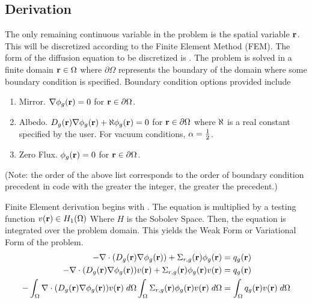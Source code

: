   \subsection{Derivation}
    \label{sec:formulation:derivation}
    The only remaining continuous variable in the problem is the spatial 
    variable $\mathbf{r}$. This will be discretized according to the Finite Element 
    Method (FEM). The form of the diffusion equation to be discretized is 
    . The problem is solved in a finite domain 
    $\mathbf{r} \in \Omega$ where $\partial \Omega$ represents the boundary of the 
    domain where some boundary condition is specified. Boundary condition 
    options provided include
    \begin{enumerate}
      \item Mirror. $\mathbf{\nabla} \phi_g(\mathbf{r}) = 0$ for $\mathbf{r} \in \partial \Omega$.
      \item Albedo. $D_g(\mathbf{r}) \mathbf{\nabla} \phi_g(\mathbf{r}) + \aleph \phi_g(\mathbf{r})=0$ for 
        $\mathbf{r} \in \partial \Omega$ where $\aleph$ is a real constant specified
        by the user. For vacuum conditions, $\alpha = \frac{1}{2}$.
      \item Zero Flux. $\phi_g(\mathbf{r}) = 0$ for $\mathbf{r} \in \partial \Omega$.
    \end{enumerate}
    (Note: the order of the above list corresponds to the order of boundary 
    condition precedent in code with the greater the integer, the greater the 
    precedent.)
    
    Finite Element derivation begins with .
    The equation is multiplied by a testing function $v(\mathbf{r}) \in H_1(\Omega)$ 
    Where $H$ is the Sobolev Space. Then, the equation is integrated over the 
    problem domain. This yields the Weak Form or Variational Form of the 
    problem.
    \begin{align}
      -\mathbf{\nabla} \cdot (D_g(\mathbf{r}) \mathbf{\nabla} \phi_g(\mathbf{r})) + \Sigma_{r,g}(\mathbf{r}) \phi_g(\mathbf{r})
        &=q_g(\mathbf{r}) \\
      -\mathbf{\nabla} \cdot (D_g(\mathbf{r}) \mathbf{\nabla} \phi_g(\mathbf{r})) v(\mathbf{r}) + 
        \Sigma_{r,g}(\mathbf{r}) \phi_g(\mathbf{r}) v(\mathbf{r}) &=
        q_g(\mathbf{r}) \\
      - \int_{\Omega} \mathbf{\nabla} \cdot (D_g(\mathbf{r}) \mathbf{\nabla} \phi_g(\mathbf{r})) v(\mathbf{r}) \; d\Omega
        \int_{\Omega} \Sigma_{r,g}(\mathbf{r}) \phi_g(\mathbf{r}) v(\mathbf{r}) \;d\Omega &=
        \int_{\Omega} q_g(\mathbf{r}) v(\mathbf{r}) \;d\Omega
    \end{align}
    
